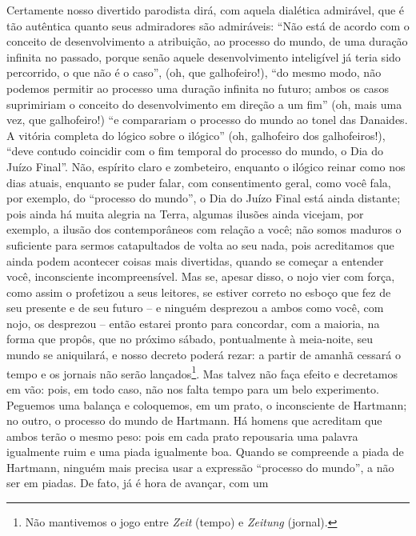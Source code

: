     Certamente nosso divertido parodista dirá, com aquela dialética
    admirável, que é tão autêntica quanto seus admiradores são
    admiráveis: ``Não está de acordo com o conceito de desenvolvimento a
    atribuição, ao processo do mundo, de uma duração infinita no
    passado, porque senão aquele desenvolvimento inteligível já teria
    sido percorrido, o que não é o caso'', (oh, que galhofeiro!), ``do
    mesmo modo, não podemos permitir ao processo uma duração infinita no
    futuro; ambos os casos suprimiriam o conceito do desenvolvimento em
    direção a um fim'' (oh, mais uma vez, que galhofeiro!) ``e
    comparariam o processo do mundo ao tonel das Danaides. A vitória
    completa do lógico sobre o ilógico'' (oh, galhofeiro dos
    galhofeiros!), ``deve contudo coincidir com o fim temporal do
    processo do mundo, o Dia do Juízo Final''. Não, espírito claro e
    zombeteiro, enquanto o ilógico reinar como nos dias atuais, enquanto
    se puder falar, com consentimento geral, como você fala, por
    exemplo, do ``processo do mundo'', o Dia do Juízo Final está ainda
    distante; pois ainda há muita alegria na Terra, algumas ilusões
    ainda vicejam, por exemplo, a ilusão dos contemporâneos com relação
    a você; não somos maduros o suficiente para sermos catapultados de
    volta ao seu nada, pois acreditamos que ainda podem acontecer coisas
    mais divertidas, quando se começar a entender você, inconsciente
    incompreensível. Mas se, apesar disso, o nojo vier com força, como
    assim o profetizou a seus leitores, se estiver correto no esboço que
    fez de seu presente e de seu futuro -- e ninguém desprezou a ambos
    como você, com nojo, os desprezou -- então estarei pronto para
    concordar, com a maioria, na forma que propôs, que no próximo
    sábado, pontualmente à meia-noite, seu mundo se aniquilará, e nosso
    decreto poderá rezar: a partir de amanhã cessará o tempo e os
    jornais não serão lançados\footnote{Não mantivemos o jogo entre
      \emph{Zeit} (tempo) e \emph{Zeitung} (jornal).}. Mas talvez não
    faça efeito e decretamos em vão: pois, em todo caso, não nos falta
    tempo para um belo experimento. Peguemos uma balança e coloquemos,
    em um prato, o inconsciente de Hartmann; no outro, o processo do
    mundo de Hartmann. Há homens que acreditam que ambos terão o mesmo
    peso: pois em cada prato repousaria uma palavra igualmente ruim e
    uma piada igualmente boa. Quando se compreende a piada de
    Hartmann, ninguém mais precisa usar a expressão ``processo do
    mundo'', a não ser em piadas. De fato, já é hora de avançar, com um
